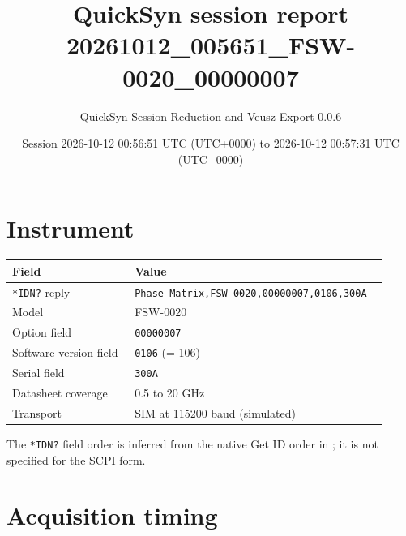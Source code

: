 \documentclass[11pt]{article}
\title{QuickSyn session report\\[0.3em]\large 20261012\_005651\_FSW-0020\_00000007}
\author{QuickSyn Session Reduction and Veusz Export 0.0.6}
\date{Session 2026-10-12 00:56:51 UTC (UTC+0000) to 2026-10-12 00:57:31 UTC (UTC+0000)}
\begin{document}
\maketitle
\thispagestyle{fancy}
\begin{center}\end{center}

\tableofcontents
\clearpage

\section{Instrument}

\begin{center}
\begin{tabular}{@{}p{0.3\linewidth}p{0.62\linewidth}@{}}
\toprule
\textbf{Field} & \textbf{Value} \\
\midrule
\texttt{*IDN?} reply & \texttt{Phase Matrix,FSW-0020,00000007,0106,300A} \\
Model & FSW-0020 \\
Option field & \texttt{00000007} \\
Software version field & \texttt{0106} (= 106) \\
Serial field & \texttt{300A} \\
Datasheet coverage & 0.5 to 20 GHz \\
Transport & SIM at 115200 baud (simulated) \\
\bottomrule
\end{tabular}
\end{center}

The \texttt{*IDN?} field order is inferred from the native Get ID order in
\cite{nicomms}; it is not specified for the SCPI form.

\section{Acquisition timing}
\end{document}
